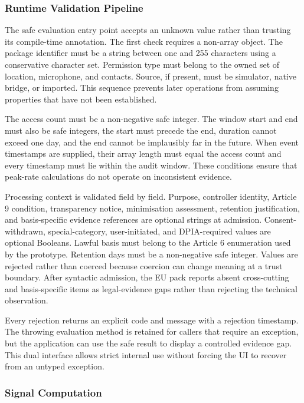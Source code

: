 \subsubsection{Runtime Validation Pipeline}

The safe evaluation entry point accepts an unknown value rather than trusting its compile-time annotation. The first check requires a non-array object. The package identifier must be a string between one and 255 characters using a conservative character set. Permission type must belong to the owned set of location, microphone, and contacts. Source, if present, must be simulator, native bridge, or imported. This sequence prevents later operations from assuming properties that have not been established.

The access count must be a non-negative safe integer. The window start and end must also be safe integers, the start must precede the end, duration cannot exceed one day, and the end cannot be implausibly far in the future. When event timestamps are supplied, their array length must equal the access count and every timestamp must lie within the audit window. These conditions ensure that peak-rate calculations do not operate on inconsistent evidence.

Processing context is validated field by field. Purpose, controller identity, Article 9 condition, transparency notice, minimisation assessment, retention justification, and basis-specific evidence references are optional strings at admission. Consent-withdrawn, special-category, user-initiated, and DPIA-required values are optional Booleans. Lawful basis must belong to the Article 6 enumeration used by the prototype. Retention days must be a non-negative safe integer. Values are rejected rather than coerced because coercion can change meaning at a trust boundary. After syntactic admission, the EU pack reports absent cross-cutting and basis-specific items as legal-evidence gaps rather than rejecting the technical observation.

Every rejection returns an explicit code and message with a rejection timestamp. The throwing evaluation method is retained for callers that require an exception, but the application can use the safe result to display a controlled evidence gap. This dual interface allows strict internal use without forcing the UI to recover from an untyped exception.

\subsubsection{Signal Computation}


